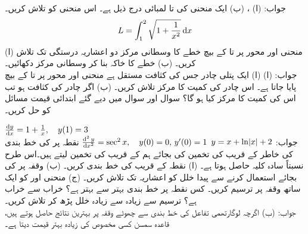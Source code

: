 جواب:\quad
(ا) ، (ب) 
ایک منحنی کی  تا  لمبائی درج ذیل ہے۔ اس منحنی کو تلاش کریں۔
\begin{align*}
L=\int_1^2\sqrt{1+\frac{1}{x^2}}\dif x
\end{align*}
(ا) منحنی  اور محور  پر  تا  کے بیچ خطے کا وسطانی مرکز دو اعشاریہ درستگی تک تلاش کریں۔ (ب) خطے کا خاکہ بنا کر وسطانی مرکز دکھائیں۔\\
جواب:\quad
(ا) 
(ا) ایک پتلی چادر جس کی کثافت مستقل ہے منحنی  اور محور  پر  تا  کے بیچ پایا جاتا ہے۔ اس چادر کی کمیت کا مرکز تلاش کریں۔ (ب) اگر چادر کی کثافت  ہو تب اس کی کمیت کا مرکز کیا ہو گا؟
سوال  اور سوال  میں دیے گئے ابتدائی قیمت مسائل کو حل کریں۔

$\frac{\dif y}{\dif x}=1+\frac{1}{x},\quad y(1)=3$\\
جواب:\quad
$y=x+\ln\abs{x}+2$
$\frac{\dif^{\,2} y}{\dif x^2}=\sec^2 x, \quad y(0)=0,\, y'(0)=1$
نقطہ  پر  کی خط بندی کی خاطر  کے قریب  کی تخمین کی بجائے ہم  کے قریب  کی تخمین لیتے ہیں۔اس طرح نسبتاً سادہ کلیہ حاصل ہوتا ہے۔ (ا) نقطہ  کے قریب  کی خط بندی کریں۔ (ب) وقفہ  پر  کی بجائے   استعمال کرنے سے پیدا خلل کو  اعشاریہ تک تلاش کریں۔ (ج) منحنی  اور  کو ایک ساتھ وقفہ  پر ترسیم کریں۔ کس نقطہ پر خط بندی بہتر سے بہتر ہے؟  خراب سے خراب ہے؟ ترسیم سے زیادہ سے زیادہ خلل پڑھ کر تلاش کریں۔\\
جواب:\quad
 (ب)
اگرچہ لوگارتھمی تفاعل کی خط بندی سے چھوٹے وقفہ پر بہترین نتائج حاصل ہوتے ہیں، قاعدہ سمسن کسی مخصوص  کی زیادہ بہتر قیمت دیتا ہے۔

